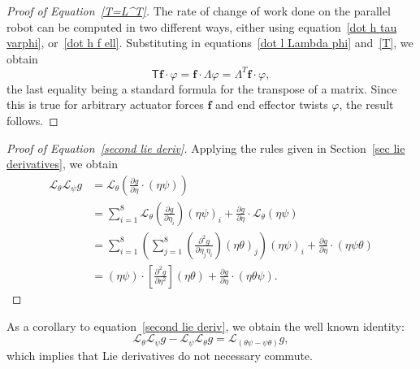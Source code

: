 \documentclass[reqno,12pt]{amsart}
\newcommand{\liederiv}{\mathcal L}
\begin{document}
\begin{proof}[Proof of Equation~\eqref{T=L^T}]
The rate of change of work done on the parallel robot can be computed in two different ways, either using equation~\eqref{dot h tau varphi}, or~\eqref{dot h f ell}.  Substituting in equations~\eqref{dot l Lambda phi} and~\eqref{T}, we obtain
\begin{equation}
\mathsf T \bm f \cdot \varphi = \bm f \cdot \mathsf \Lambda \varphi = \mathsf\Lambda^{T} \bm f \cdot \varphi ,
\end{equation}
the last equality being a standard formula for the transpose of a matrix.  Since this is true for arbitrary actuator forces $\bm f$ and end effector twists $\varphi$, the result follows.
\end{proof}

\begin{proof}[Proof of Equation~\eqref{second lie deriv}]
Applying the rules given in Section~\ref{sec lie derivatives}, we obtain
\begin{align}
\liederiv_\theta \liederiv_\psi g
&= 
\liederiv_\theta \left( \frac{\partial g}{\partial \eta} \cdot (\eta \psi) \right) \\
&= 
\sum_{i=1}^8 \liederiv_\theta\left(\frac{\partial g}{\partial \eta_i}\right) (\eta \psi)_i +
\frac{\partial g}{\partial \eta} \cdot \liederiv_\theta (\eta \psi) \\
&= 
\sum_{i=1}^8 \left( \sum_{j=1}^8\left(\frac{\partial^2 g}{\partial \eta_j \eta_i}\right)(\eta\theta)_j\right) (\eta \psi)_i +
 \frac{\partial g}{\partial \eta} \cdot (\eta \psi \theta) \\
&= (\eta \psi) \cdot \left[\frac{\partial^2 g}{\partial \eta^2}\right](\eta \theta) + \frac{\partial g}{\partial \eta} \cdot (\eta \theta \psi) .
\end{align}
\end{proof}

As a corollary to equation~\eqref{second lie deriv}, we obtain the well known identity:
\begin{equation}
\label{lie bracket diff = diff lie bracket}
\liederiv_\theta \liederiv_\psi g - \liederiv_\psi \liederiv_\theta g = \liederiv_{(\theta\psi - \psi\theta)} g,
\end{equation}
which implies that Lie derivatives do not necessary commute.
\end{document}
